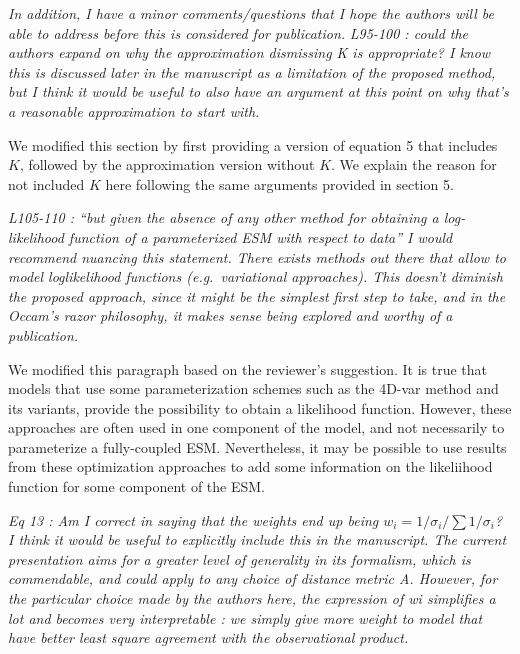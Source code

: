 \emph{In addition, I have a minor comments/questions that I hope the
authors will be able to address before this is considered for
publication.} \emph{L95-100 : could the authors expand on why the
approximation dismissing K is appropriate? I know this is discussed
later in the manuscript as a limitation of the proposed method, but I
think it would be useful to also have an argument at this point on why
that's a reasonable approximation to start with.}

We modified this section by first providing a version of equation 5 that
includes \(K\), followed by the approximation version without \(K\). We
explain the reason for not included \(K\) here following the same
arguments provided in section 5.

\emph{L105-110 : ``but given the absence of any other method for
obtaining a log-likelihood function of a parameterized ESM with respect
to data'' I would recommend nuancing this statement. There exists
methods out there that allow to model loglikelihood functions
(e.g.~variational approaches). This doesn't diminish the proposed
approach, since it might be the simplest first step to take, and in the
Occam's razor philosophy, it makes sense being explored and worthy of a
publication.}

We modified this paragraph based on the reviewer's suggestion. It is
true that models that use some parameterization schemes such as the
4D-var method and its variants, provide the possibility to obtain a
likelihood function. However, these approaches are often used in one
component of the model, and not necessarily to parameterize a
fully-coupled ESM. Nevertheless, it may be possible to use results from
these optimization approaches to add some information on the likeliihood
function for some component of the ESM.

\emph{Eq 13 : Am I correct in saying that the weights end up being
\(w_i = 1/\sigma_i / \sum 1/\sigma_i\)? I think it would be useful to
explicitly include this in the manuscript. The current presentation aims
for a greater level of generality in its formalism, which is
commendable, and could apply to any choice of distance metric A.
However, for the particular choice made by the authors here, the
expression of wi simplifies a lot and becomes very interpretable : we
simply give more weight to model that have better least square agreement
with the observational product.}

